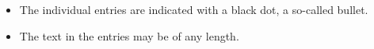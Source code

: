\documentclass{article}
\begin{document}
\begin{itemize}
  \item The individual entries are indicated with a black dot, a so-called bullet.
  \item The text in the entries may be of any length.
\end{itemize}
\end{document}
